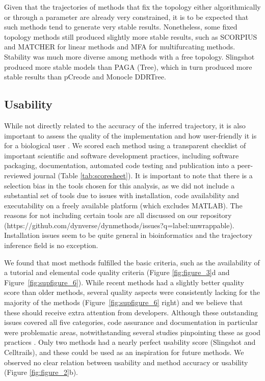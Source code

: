 Given that the trajectories of methods that fix the topology either algorithmically or through a parameter are already very constrained, it is to be expected that such methods tend to generate very stable results. Nonetheless, some fixed topology methods still produced slightly more stable results, such as SCORPIUS and MATCHER for linear methods and MFA for multifurcating methods. Stability was much more diverse among methods with a free topology. Slingshot produced more stable models than PAGA (Tree), which in turn produced more stable results than pCreode and Monocle DDRTree.

\subsection{Usability}

While not directly related to the accuracy of the inferred trajectory, it is also important to assess the quality of the implementation and how user-friendly it is for a biological user \cite{taschuk_tensimplerules_2017}. We scored each method using a transparent checklist of important scientific and software development practices, including software packaging, documentation, automated code testing and publication into a peer-reviewed journal (Table \ref{tab:scoresheet}). It is important to note that there is a selection bias in the tools chosen for this analysis, as we did not include a substantial set of tools due to issues with installation, code availability and executability on a freely available platform (which excludes MATLAB). The reasons for not including certain tools are all discussed on our repository (https://github.com/dynverse/dynmethods/issues?q=label:unwrappable). Installation issues seem to be quite general in bioinformatics \cite{mangul_comprehensiveanalysisusability_2018} and the trajectory inference field is no exception.

We found that most methods fulfilled the basic criteria, such as the availability of a tutorial and elemental code quality criteria (Figure \ref{fig:figure_3}d and Figure~\ref{fig:supfigure_6}). While recent methods had a slightly better quality score than older methods, several quality aspects were consistently lacking for the majority of the methods (Figure~\ref{fig:supfigure_6} right) and we believe that these should receive extra attention from developers. Although these outstanding issues covered all five categories, code assurance and documentation in particular were problematic areas, notwithstanding several studies pinpointing these as good practices \cite{wilson_bestpracticesscientific_2014,artaza_top10metrics_2016}. Only two methods had a nearly perfect usability score (Slingshot and Celltrails), and these could be used as an inspiration for future methods. We observed no clear relation between usability and method accuracy or usability (Figure \ref{fig:figure_2}b).


